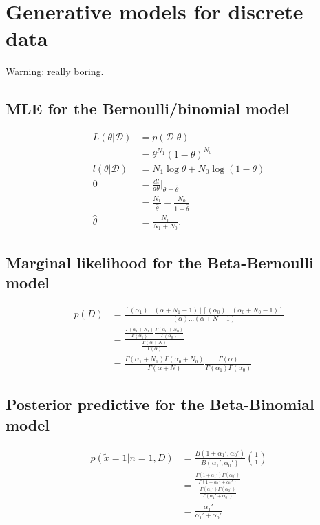 \section{Generative models for discrete data}
Warning: really boring.
\subsection{MLE for the Bernoulli/binomial model}
\begin{align*}
L(\theta|\mathcal{D}) &= p(\mathcal{D}|\theta)\\
&= \theta^{N_1} (1-\theta)^{N_0}\\
l(\theta|\mathcal{D}) &= N_1\log\theta + N_0\log(1-\theta)\\
0 &= \frac{dl}{d\theta}\bigg|_{\theta=\hat\theta}\\
&= \frac{N_1}{\hat\theta} - \frac{N_0}{1-\hat\theta}\\
\hat\theta &= \frac{N_1}{N_1+N_0}.
\end{align*}

\subsection{Marginal likelihood for the Beta-Bernoulli model}
\begin{align*}
p(D) &= \frac{[(\alpha_1)\dots(\alpha+N_1-1)] [(\alpha_0)\dots(\alpha_0+N_0-1)]}{(\alpha)\dots(\alpha+N-1)}\\
&= \frac{\frac{\Gamma(\alpha_1+N_1)}{\Gamma(\alpha_1)} \frac{\Gamma(\alpha_0+N_0)}{\Gamma(\alpha_0)}}{\frac{\Gamma(\alpha+N)}{\Gamma(\alpha)}}\\
&= \frac{\Gamma(\alpha_1+N_1)\Gamma(\alpha_0+N_0)}{\Gamma(\alpha+N)} \frac{\Gamma(\alpha)}{\Gamma(\alpha_1)\Gamma(\alpha_0)}
\end{align*}

\subsection{Posterior predictive for the Beta-Binomial model}
\begin{align*}
p(\tilde{x}=1|n=1,D) &= \frac{B(1+\alpha_1', \alpha_0')}{B(\alpha_1',\alpha_0')} {1\choose 1}\\
&= \frac{\frac{\Gamma(1+\alpha_1')\Gamma(\alpha_0')}{\Gamma(1+\alpha_1'+\alpha_0')}} {\frac{\Gamma(\alpha_1')\Gamma(\alpha_0')}{\Gamma(\alpha_1'+\alpha_0')}}\\
&= \frac{\alpha_1'}{\alpha_1'+\alpha_0'}
\end{align*}

